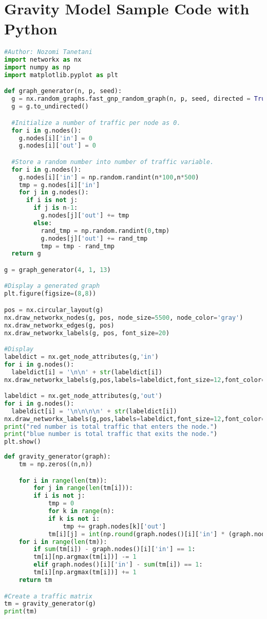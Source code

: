 \section{Gravity Model Sample Code with Python}

\begin{lstlisting}[language=python,caption=Generate Simple Network with Python]
#Author: Nozomi Tanetani
import networkx as nx
import numpy as np
import matplotlib.pyplot as plt 

def graph_generator(n, p, seed):
  g = nx.random_graphs.fast_gnp_random_graph(n, p, seed, directed = True) #Generate a random graph
  g = g.to_undirected()

  #Initialize a number of traffic per node as 0.
  for i in g.nodes():
    g.nodes[i]['in'] = 0
    g.nodes[i]['out'] = 0

  #Store a random number into number of traffic variable.
  for i in g.nodes():
    g.nodes[i]['in'] = np.random.randint(n*100,n*500)
    tmp = g.nodes[i]['in']
    for j in g.nodes():
      if i is not j:
        if j is n-1:
          g.nodes[j]['out'] += tmp
        else:
          rand_tmp = np.random.randint(0,tmp)
          g.nodes[j]['out'] += rand_tmp
          tmp = tmp - rand_tmp
  return g

g = graph_generator(4, 1, 13)

#Display a generated graph
plt.figure(figsize=(8,8))

pos = nx.circular_layout(g)
nx.draw_networkx_nodes(g, pos, node_size=5500, node_color='gray')
nx.draw_networkx_edges(g, pos)
nx.draw_networkx_labels(g, pos, font_size=20)

#Display
labeldict = nx.get_node_attributes(g,'in')
for i in g.nodes():
  labeldict[i] = '\n\n' + str(labeldict[i])
nx.draw_networkx_labels(g,pos,labels=labeldict,font_size=12,font_color='#FFAAAA')

labeldict = nx.get_node_attributes(g,'out')
for i in g.nodes():
  labeldict[i] = '\n\n\n\n' + str(labeldict[i])
nx.draw_networkx_labels(g,pos,labels=labeldict,font_size=12,font_color='#AAFFFF')
print("red number is total traffic that enters the node.")
print("blue number is total traffic that exits the node.")
plt.show()
\end{lstlisting}

\begin{lstlisting}[language=python,caption=Gravity Generator Function with Python]
def gravity_generator(graph):
    tm = np.zeros((n,n))

    for i in range(len(tm)):
        for j in range(len(tm[i])):
        if i is not j:
            tmp = 0
            for k in range(n):
            if k is not i:
                tmp += graph.nodes[k]['out']
            tm[i][j] = int(np.round(graph.nodes()[i]['in'] * (graph.nodes[j]['out'] / tmp))) # Slide Page 15
    for i in range(len(tm)):
        if sum(tm[i]) - graph.nodes()[i]['in'] == 1:
        tm[i][np.argmax(tm[i])] -= 1
        elif graph.nodes()[i]['in'] - sum(tm[i]) == 1:
        tm[i][np.argmax(tm[i])] += 1
    return tm

#Create a traffic matrix
tm = gravity_generator(g)
print(tm)
\end{lstlisting}

